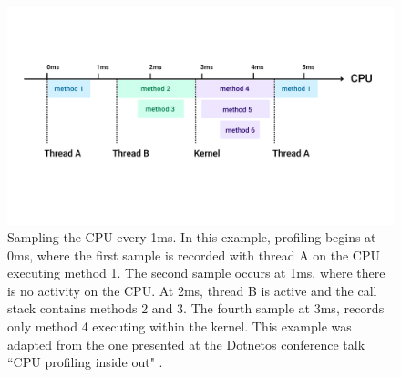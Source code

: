 \begin{figure}[h!]
    \includegraphics[width=\linewidth]{report-a_sampling_timeline}
    \caption{Sampling the CPU every 1ms. In this example, profiling begins at 0ms, where the first sample is recorded with thread A on the CPU executing method 1. The second sample occurs at 1ms, where there is no activity on the CPU. At 2ms, thread B is active and the call stack contains methods 2 and 3. The fourth sample at 3ms, records only method 4 executing within the kernel. This example was adapted from the one presented at the Dotnetos conference talk ``CPU profiling inside out" \cite{YouTubeDotnetosCPUProfling}.}
    \label{fig:sel4_microkernel}
\end{figure}

